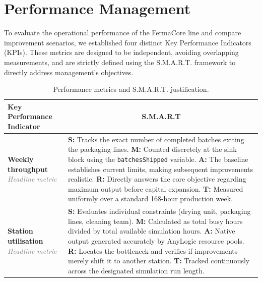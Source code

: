 \section{Performance Management}
\label{sec:performance}

To evaluate the operational performance of the FermaCore line and compare improvement scenarios, we established four distinct Key Performance Indicators (KPIs). These metrics are designed to be independent, avoiding overlapping measurements, and are strictly defined using the S.M.A.R.T. framework to directly address management's objectives.

\begin{table}[H]
\centering
\caption{Performance metrics and S.M.A.R.T. justification.}
\label{tab:kpis}
\renewcommand{\arraystretch}{1.5}
\begin{tabularx}{\textwidth}{@{} >{\raggedright\arraybackslash}p{4cm} X @{}}
\toprule
\rowcolor{black!5} 
\textbf{Key Performance Indicator} & \multicolumn{1}{c}{\textbf{S.M.A.R.T}} \\
\midrule

\textbf{Weekly throughput}\newline
\textcolor{gray}{\small \textit{Headline metric}} & 
\textcolor{red!70!black}{\textbf{S:}} Tracks the exact number of completed batches exiting the packaging lines. \newline
\textcolor{orange!80!black}{\textbf{M:}} Counted discretely at the sink block using the \texttt{batchesShipped} variable. \newline
\textcolor{green!60!black}{\textbf{A:}} The baseline establishes current limits, making subsequent improvements realistic. \newline
\textcolor{blue!70!black}{\textbf{R:}} Directly answers the core objective regarding maximum output before capital expansion. \newline
\textcolor{purple!70!black}{\textbf{T:}} Measured uniformly over a standard 168-hour production week. \\
\midrule

\textbf{Station utilisation}\newline
\textcolor{gray}{\small \textit{Headline metric}} & 
\textcolor{red!70!black}{\textbf{S:}} Evaluates individual constraints (drying unit, packaging lines, cleaning team). \newline
\textcolor{orange!80!black}{\textbf{M:}} Calculated as total busy hours divided by total available simulation hours. \newline
\textcolor{green!60!black}{\textbf{A:}} Native output generated accurately by AnyLogic resource pools. \newline
\textcolor{blue!70!black}{\textbf{R:}} Locates the bottleneck and verifies if improvements merely shift it to another station. \newline
\textcolor{purple!70!black}{\textbf{T:}} Tracked continuously across the designated simulation run length. \\
\midrule


\end{tabularx}
\end{table}
